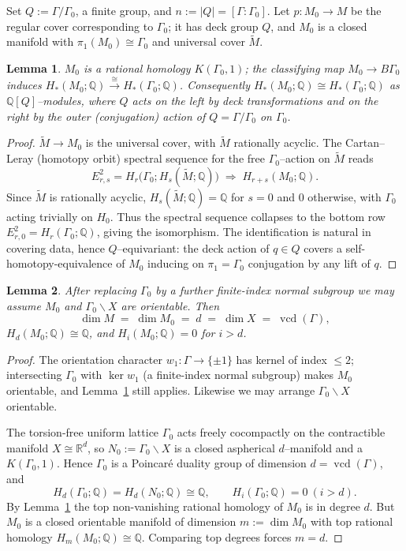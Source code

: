 \documentclass[12pt]{article}
\newcommand{\bR}{\mathbb{R}}
\newcommand{\bQ}{\mathbb{Q}}
\DeclareMathOperator{\vcd}{vcd}
\newtheorem{lemma}{Lemma}
\theoremstyle{definition}
\begin{document}
Set $Q:=\Gamma/\Gamma_0$, a finite group, and $n:=|Q|=[\Gamma:\Gamma_0]$.  Let
$p\colon M_0\to M$ be the regular cover corresponding to $\Gamma_0$; it has deck
group $Q$, and $M_0$ is a closed manifold with $\pi_1(M_0)\cong\Gamma_0$ and
universal cover $\widetilde M$.

\begin{lemma}\label{lem:qhomology}
$M_0$ is a rational homology $K(\Gamma_0,1)$; the classifying map
$M_0\to B\Gamma_0$ induces $H_*(M_0;\bQ)\xrightarrow{\ \cong\ }H_*(\Gamma_0;\bQ)$.
Consequently $H_*(M_0;\bQ)\cong H_*(\Gamma_0;\bQ)$ as $\bQ[Q]$--modules, where $Q$
acts on the left by deck transformations and on the right by the outer
(conjugation) action of $Q=\Gamma/\Gamma_0$ on $\Gamma_0$.
\end{lemma}

\begin{proof}
$\widetilde M\to M_0$ is the universal cover, with $\widetilde M$ rationally
acyclic.  The Cartan--Leray (homotopy orbit) spectral sequence for the free
$\Gamma_0$--action on $\widetilde M$ reads
\[
   E^2_{r,s}=H_r\!\bigl(\Gamma_0;H_s(\widetilde M;\bQ)\bigr)
   \;\Longrightarrow\; H_{r+s}(M_0;\bQ).
\]
Since $\widetilde M$ is rationally acyclic, $H_s(\widetilde M;\bQ)=\bQ$ for $s=0$
and $0$ otherwise, with $\Gamma_0$ acting trivially on $H_0$.  Thus the spectral
sequence collapses to the bottom row $E^2_{r,0}=H_r(\Gamma_0;\bQ)$, giving the
isomorphism.  The identification is natural in covering data, hence
$Q$--equivariant: the deck action of $q\in Q$ covers a self-homotopy-equivalence
of $M_0$ inducing on $\pi_1=\Gamma_0$ conjugation by any lift of $q$.
\end{proof}

\begin{lemma}\label{lem:dimension}
After replacing $\Gamma_0$ by a further finite-index normal subgroup we may assume
$M_0$ and $\Gamma_0\backslash X$ are orientable.  Then
\[
   \dim M \;=\; \dim M_0 \;=\; d \;=\; \dim X \;=\; \vcd(\Gamma),
\]
$H_d(M_0;\bQ)\cong\bQ$, and $H_i(M_0;\bQ)=0$ for $i>d$.
\end{lemma}

\begin{proof}
The orientation character $w_1\colon\Gamma\to\{\pm1\}$ has kernel of index
$\le2$; intersecting $\Gamma_0$ with $\ker w_1$ (a finite-index normal subgroup)
makes $M_0$ orientable, and Lemma~\ref{lem:qhomology} still applies.  Likewise we
may arrange $\Gamma_0\backslash X$ orientable.

The torsion-free uniform lattice $\Gamma_0$ acts freely cocompactly on the
contractible manifold $X\cong\bR^d$, so $N_0:=\Gamma_0\backslash X$ is a closed
aspherical $d$--manifold and a $K(\Gamma_0,1)$.  Hence $\Gamma_0$ is a
Poincar\'e duality group of dimension $d=\vcd(\Gamma)$, and
\[
   H_d(\Gamma_0;\bQ)=H_d(N_0;\bQ)\cong\bQ,\qquad H_i(\Gamma_0;\bQ)=0\ (i>d).
\]
By Lemma~\ref{lem:qhomology} the top non-vanishing rational homology of $M_0$ is
in degree $d$.  But $M_0$ is a closed orientable manifold of dimension
$m:=\dim M_0$ with top rational homology $H_m(M_0;\bQ)\cong\bQ$.  Comparing top
degrees forces $m=d$.
\end{proof}
\end{document}
